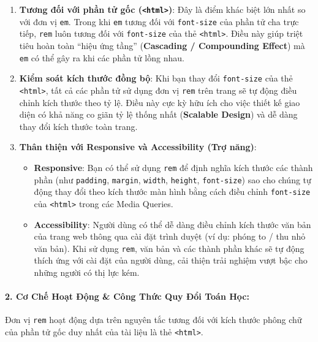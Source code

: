 \documentclass[11pt,oneside]{book}
\newcommand{\codeinline}[1]{\textcolor{accentOrange}{\texttt{#1}}}
\newcommand{\term}[1]{\textbf{\textcolor{primaryBlue}{#1}}}
\begin{document}
\begin{conceptBox}
\begin{enumerate}[leftmargin=1.5em, itemsep=3pt, parsep=0pt]
    \item \textbf{Tương đối với phần tử gốc (\codeinline{<html>})}: Đây là điểm khác biệt lớn nhất so với đơn vị \codeinline{em}. Trong khi \codeinline{em} tương đối với \codeinline{font-size} của phần tử cha trực tiếp, \codeinline{rem} luôn tương đối với \codeinline{font-size} của thẻ \codeinline{<html>}. Điều này giúp triệt tiêu hoàn toàn ``hiệu ứng tầng'' (\term{Cascading / Compounding Effect}) mà \codeinline{em} có thể gây ra khi các phần tử lồng nhau.
    \item \textbf{Kiểm soát kích thước đồng bộ}: Khi bạn thay đổi \codeinline{font-size} của thẻ \codeinline{<html>}, tất cả các phần tử sử dụng đơn vị \codeinline{rem} trên trang sẽ tự động điều chỉnh kích thước theo tỷ lệ. Điều này cực kỳ hữu ích cho việc thiết kế giao diện có khả năng co giãn tỷ lệ thống nhất (\term{Scalable Design}) và dễ dàng thay đổi kích thước toàn trang.
    \item \textbf{Thân thiện với Responsive và Accessibility (Trợ năng)}:
    \begin{itemize}[leftmargin=1.2em, itemsep=2pt]
        \item \textbf{Responsive}: Bạn có thể sử dụng \codeinline{rem} để định nghĩa kích thước các thành phần (như \codeinline{padding}, \codeinline{margin}, \codeinline{width}, \codeinline{height}, \codeinline{font-size}) sao cho chúng tự động thay đổi theo kích thước màn hình bằng cách điều chỉnh \codeinline{font-size} của \codeinline{<html>} trong các Media Queries.
        \item \textbf{Accessibility}: Người dùng có thể dễ dàng điều chỉnh kích thước văn bản của trang web thông qua cài đặt trình duyệt (ví dụ: phóng to / thu nhỏ văn bản). Khi sử dụng \codeinline{rem}, văn bản và các thành phần khác sẽ tự động thích ứng với cài đặt của người dùng, cải thiện trải nghiệm vượt bậc cho những người có thị lực kém.
    \end{itemize}
\end{enumerate}
\end{conceptBox}

\paragraph{2. Cơ Chế Hoạt Động \& Công Thức Quy Đổi Toán Học:}
Đơn vị \codeinline{rem} hoạt động dựa trên nguyên tắc tương đối với kích thước phông chữ của phần tử gốc duy nhất của tài liệu là thẻ \codeinline{<html>}.
\end{document}

